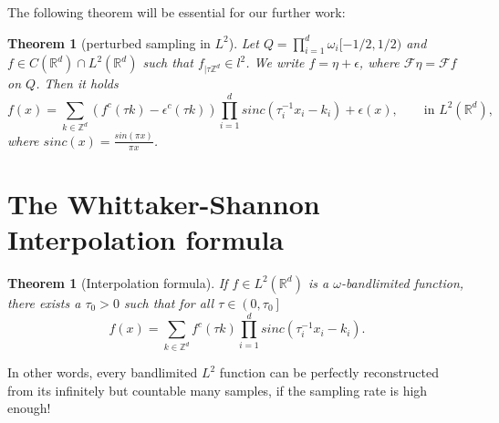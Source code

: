 \documentclass[a4paper, 11pt]{scrreprt}
\newtheorem{theorem}[defi]{Theorem}
\newcommand{\RR}{\mathbb{R}}
\newcommand{\ZZ}{\mathbb{Z}}
\newcommand{\FF}{\mathcal{F}}
\begin{document}
The following theorem will be essential for our further work:
\begin{theorem}[perturbed sampling in \(L^2\)]
\label{th:perturbed sampling}
Let \(Q = \prod_{i=1}^d \omega_i[-1/2, 1/2)\) and \\
 \({f\in C(\RR^d)\cap L^2(\RR^d)}\) such that \(f_{|\tau\ZZ^d} \in l^2\). We write \(f=\eta + \epsilon\), where \(\FF\eta = \FF f\) on \(Q\). Then it holds
\begin{equation}
	f(x) = \sum_{k\in\ZZ^d} (f^c(\tau k)-\epsilon^c(\tau k))\prod _{i=1}^d sinc(\tau_i^{-1}x_i-k_i)+\epsilon(x), \qquad \text{in } L^2(\RR^d),
\end{equation}
where \(sinc(x) = \frac{sin(\pi x)}{\pi x}\).
\end{theorem}

\newpage
\section{The Whittaker-Shannon Interpolation formula}

\begin{theorem}[Interpolation formula]
\label{th:interpolation}
If \(f \in L^2(\RR^d)\) is a \(\omega\)-bandlimited function, there exists a \(\tau_0 > 0\) such that for all \(\tau \in \left(0,\tau_0\right]\)
\begin{equation}
	f(x) = \sum_{k \in \ZZ^d} f^c(\tau k) \prod_{i=1}^d sinc\left(\tau_i^{-1} x_i -k_i\right).
\end{equation}
\end{theorem}
In other words, every bandlimited \(L^2\) function can be perfectly reconstructed from its infinitely but countable many samples, if the sampling rate is high enough!\\
\end{document}

